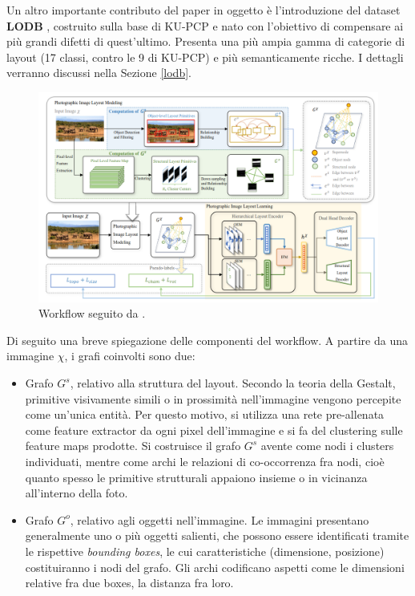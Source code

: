 Un altro importante contributo del paper in oggetto è l'introduzione del dataset \textbf{LODB} \cite{LODB}, costruito sulla base di KU-PCP e nato con l'obiettivo di compensare ai più grandi difetti di quest'ultimo. Presenta una più ampia gamma di categorie di layout (17 classi, contro le 9 di KU-PCP) e più semanticamente ricche. I dettagli verranno discussi nella Sezione \ref{lodb}.

\begin{figure}[!ht]
    \centering
    \includegraphics[width=\textwidth]{Immagini/sota/graph_arch.png}
    \caption{Workflow seguito da \cite{graph}.}
    \label{fig:arch_graph}
\end{figure}

Di seguito una breve spiegazione delle componenti del workflow. A partire da una immagine \(\chi\), i grafi coinvolti sono due:
\begin{itemize}
    \item Grafo \(G^s\), relativo alla struttura del layout. Secondo la teoria della Gestalt, primitive visivamente simili o in prossimità nell'immagine vengono percepite come un'unica entità. Per questo motivo, si utilizza una rete pre-allenata come feature extractor da ogni pixel dell'immagine e si fa del clustering sulle feature maps prodotte. Si costruisce il grafo \(G^s\) avente come nodi i clusters individuati, mentre come archi le relazioni di co-occorrenza fra nodi, cioè quanto spesso le primitive strutturali appaiono insieme o in vicinanza all'interno della foto.
    \item Grafo \(G^o\), relativo agli oggetti nell'immagine. Le immagini presentano generalmente uno o più oggetti salienti, che possono essere identificati tramite le rispettive \textit{bounding boxes}, le cui caratteristiche (dimensione, posizione) costituiranno i nodi del grafo. Gli archi codificano aspetti come le dimensioni relative fra due boxes, la distanza fra loro.
\end{itemize}

